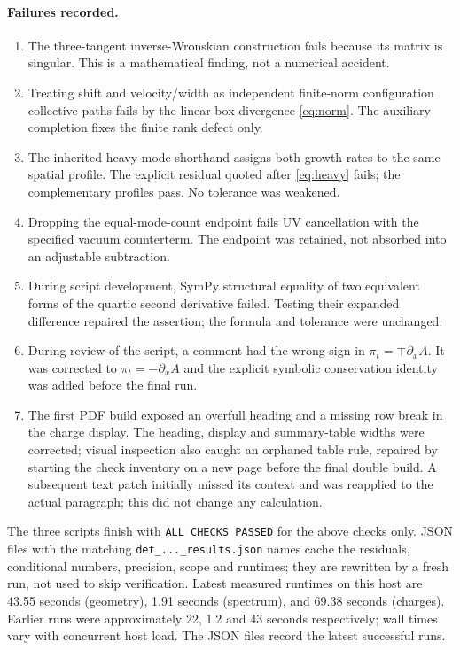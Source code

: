 \documentclass[11pt,a4paper]{article}
\begin{document}
\paragraph{Failures recorded.}
\begin{enumerate}
\item The three-tangent inverse-Wronskian construction fails because its
matrix is singular. This is a mathematical finding, not a numerical accident.
\item Treating shift and velocity/width as independent finite-norm
configuration collective paths fails by the linear box divergence
\eqref{eq:norm}. The auxiliary completion fixes the finite rank defect only.
\item The inherited heavy-mode shorthand assigns both growth rates to the
same spatial profile. The explicit residual quoted after \eqref{eq:heavy}
fails; the complementary profiles pass. No tolerance was weakened.
\item Dropping the equal-mode-count endpoint fails UV cancellation with the
specified vacuum counterterm. The endpoint was retained, not absorbed into
an adjustable subtraction.
\item During script development, SymPy structural equality of two equivalent
forms of the quartic second derivative failed. Testing their expanded
difference repaired the assertion; the formula and tolerance were unchanged.
\item During review of the script, a comment had the wrong sign in
$\pi_t=\mp\partial_x A$. It was corrected to $\pi_t=-\partial_x A$ and the
explicit symbolic conservation identity was added before the final run.
\item The first PDF build exposed an overfull heading and a missing row break
in the charge display. The heading, display and summary-table widths were
corrected; visual inspection also caught an orphaned table rule, repaired
by starting the check inventory on a new page before the final double build.
A subsequent text patch initially missed its context and was reapplied to
the actual paragraph; this did not change any calculation.
\end{enumerate}
The three scripts finish with \texttt{ALL CHECKS PASSED} for the above
checks only. JSON files with the matching \texttt{det\_...\_results.json}
names cache the residuals, conditional numbers, precision, scope and runtimes;
they are rewritten by a fresh run, not used to skip verification.
Latest measured runtimes on this host are 43.55 seconds (geometry),
1.91 seconds (spectrum), and 69.38 seconds (charges). Earlier runs were
approximately 22, 1.2 and 43 seconds respectively; wall times vary with
concurrent host load. The JSON files record the latest successful runs.
\end{document}
